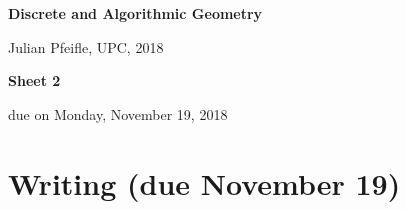 \documentclass[11pt]{amsart}
\begin{document}
\begin{center}
\textbf{\sffamily
   Discrete and Algorithmic Geometry }

\medskip
   Julian Pfeifle,
   UPC, 2018
\end{center}

\bigskip

\begin{center}
  \textbf{\sffamily Sheet 2}

\bigskip
 due on Monday, November 19, 2018

\end{center}

\bigskip
\bigskip
\bigskip

\section*{Writing (due November 19)}
\end{document}
